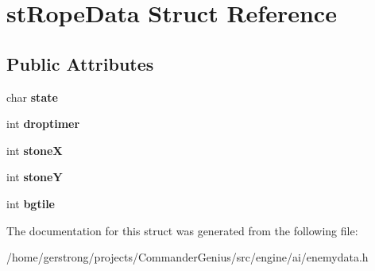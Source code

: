 \hypertarget{structst_rope_data}{
\section{stRopeData Struct Reference}
\label{structst_rope_data}
}
\subsection*{Public Attributes}
\begin{DoxyCompactItemize}
\item 
\hypertarget{structst_rope_data_aca6f0eb729a063126e15851971d219cf}{
char {\bfseries state}}
\label{structst_rope_data_aca6f0eb729a063126e15851971d219cf}

\item 
\hypertarget{structst_rope_data_a10320206591a485333de116ef6127c6e}{
int {\bfseries droptimer}}
\label{structst_rope_data_a10320206591a485333de116ef6127c6e}

\item 
\hypertarget{structst_rope_data_a28fbedce3b433e5d77bed5fb83a55129}{
int {\bfseries stoneX}}
\label{structst_rope_data_a28fbedce3b433e5d77bed5fb83a55129}

\item 
\hypertarget{structst_rope_data_a05c74d85b5724280de6d2202e625fdac}{
int {\bfseries stoneY}}
\label{structst_rope_data_a05c74d85b5724280de6d2202e625fdac}

\item 
\hypertarget{structst_rope_data_abe417c07ef0453415b9ea6afb0063e4c}{
int {\bfseries bgtile}}
\label{structst_rope_data_abe417c07ef0453415b9ea6afb0063e4c}

\end{DoxyCompactItemize}


The documentation for this struct was generated from the following file:\begin{DoxyCompactItemize}
\item 
/home/gerstrong/projects/CommanderGenius/src/engine/ai/enemydata.h\end{DoxyCompactItemize}
